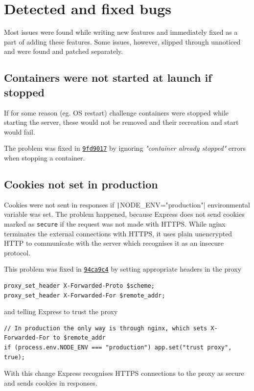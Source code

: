\section{Detected and fixed bugs}

Most issues were found while writing new features and immediately fixed as a part of adding these features. Some issues, however, slipped through unnoticed and were found and patched separately.

\subsection{Containers were not started at launch if stopped}

If for some reason (eg. OS restart) challenge containers were stopped while starting the server, these would not be removed and their recreation and start would fail.

The problem was fixed in \href{https://github.com/krzysdz/inz/commit/9fd9017ce994f577233ce0544bbd0cf1df3e0e55}{\texttt{9fd9017}} by ignoring \textit{"container already stopped"} errors when stopping a container.

\subsection{Cookies not set in production}

Cookies were not sent in responses if \texttt|NODE_ENV="production"| environmental variable was set. The problem happened, because Express does not send cookies marked as \texttt{secure} if the request was not made with HTTPS. While nginx terminates the external connections with HTTPS, it uses plain unencrypted HTTP to communicate with the server which recognises it as an insecure protocol.

This problem was fixed in \href{https://github.com/krzysdz/inz/commit/94ca9c4124954c94c9fe8e27dc59305aa59b31ad}{\texttt{94ca9c4}} by setting appropriate headers in the proxy
\begin{verbatim}
proxy_set_header X-Forwarded-Proto $scheme;
proxy_set_header X-Forwarded-For $remote_addr;
\end{verbatim}
and telling Express to trust the proxy
\begin{verbatim}
// In production the only way is through nginx, which sets X-Forwarded-For to $remote_addr
if (process.env.NODE_ENV === "production") app.set("trust proxy", true);
\end{verbatim}
With this change Express recognises HTTPS connections to the proxy as secure and sends cookies in responses.

